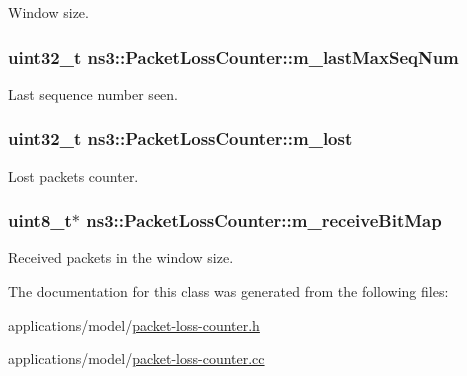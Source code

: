 Window size. 

\subsubsection[{\texorpdfstring{m\+\_\+last\+Max\+Seq\+Num}{m_lastMaxSeqNum}}]{\setlength{\rightskip}{0pt plus 5cm}uint32\+\_\+t ns3\+::\+Packet\+Loss\+Counter\+::m\+\_\+last\+Max\+Seq\+Num\hspace{0.3cm}{\ttfamily [private]}}\hypertarget{classns3_1_1PacketLossCounter_a4d24c5d85acd4bcaa976d0e2e9ebcc8d}{}\label{classns3_1_1PacketLossCounter_a4d24c5d85acd4bcaa976d0e2e9ebcc8d}


Last sequence number seen. 

\subsubsection[{\texorpdfstring{m\+\_\+lost}{m_lost}}]{\setlength{\rightskip}{0pt plus 5cm}uint32\+\_\+t ns3\+::\+Packet\+Loss\+Counter\+::m\+\_\+lost\hspace{0.3cm}{\ttfamily [private]}}\hypertarget{classns3_1_1PacketLossCounter_a764928ff787c0586db03f92f1e7babb1}{}\label{classns3_1_1PacketLossCounter_a764928ff787c0586db03f92f1e7babb1}


Lost packets counter. 

\subsubsection[{\texorpdfstring{m\+\_\+receive\+Bit\+Map}{m_receiveBitMap}}]{\setlength{\rightskip}{0pt plus 5cm}uint8\+\_\+t$\ast$ ns3\+::\+Packet\+Loss\+Counter\+::m\+\_\+receive\+Bit\+Map\hspace{0.3cm}{\ttfamily [private]}}\hypertarget{classns3_1_1PacketLossCounter_aaef80a448508d9395f6d9663ef2cf301}{}\label{classns3_1_1PacketLossCounter_aaef80a448508d9395f6d9663ef2cf301}


Received packets in the window size. 



The documentation for this class was generated from the following files\+:\begin{DoxyCompactItemize}
\item 
applications/model/\hyperlink{packet-loss-counter_8h}{packet-\/loss-\/counter.\+h}\item 
applications/model/\hyperlink{packet-loss-counter_8cc}{packet-\/loss-\/counter.\+cc}\end{DoxyCompactItemize}
